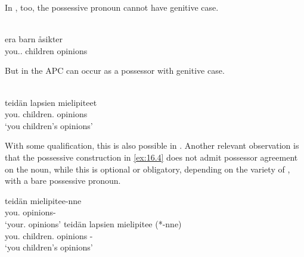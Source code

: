 \documentclass[output=paper]{langsci/langscibook}
\begin{document}
\ea\label{ex:16.2}
	\z
\z

In , too, the possessive pronoun cannot have genitive case.

\ea\label{ex:16.3}\\
    \gll   \llap{*}era                barn       åsikter\\
            you.\Pl{}.\Poss{} children opinions \\
\z

But in  the \gls{APC} can occur as a possessor with genitive case.

\ea\label{ex:16.4}\\
    \gll teidän       lapsien            mielipiteet \\
        you.\Gen{} children.\Gen{} opinions\\
	\glt    `you children’s opinions'
\z

With some qualification, this is also possible in . Another relevant
observation is that the possessive construction in \eqref{ex:16.4} does not admit possessor
agreement on the noun, while this is optional or obligatory, depending on the
variety of , with a bare possessive pronoun.

\ea\label{ex:16.5}
	\ea
		\gll teidän       mielipitee-nne \\
			you.\Gen{} opinions-\Spl{}\\
		\glt    `your.\Pl{} opinions'
	\ex
		\gll teidän       lapsien             mielipitee (*-nne)\\
            you.\Gen{} children.\Gen{} opinions \hphantom{(*}-\Spl{}\\
		\glt    `you children’s opinions'
	\z
\z
\end{document}
